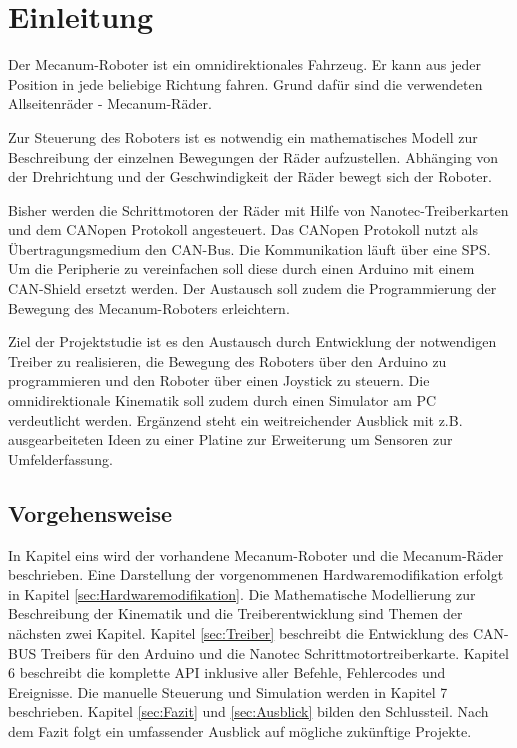 
\section{Einleitung}

Der Mecanum-Roboter ist ein omnidirektionales Fahrzeug. Er kann aus jeder Position in jede beliebige Richtung fahren. Grund dafür sind die verwendeten Allseitenräder - Mecanum-Räder. 

Zur Steuerung des Roboters ist es notwendig ein mathematisches Modell zur Beschreibung der einzelnen Bewegungen der Räder aufzustellen. Abhänging von der Drehrichtung und der Geschwindigkeit der Räder bewegt sich der Roboter.

Bisher werden die Schrittmotoren der Räder mit Hilfe von Nanotec-Treiberkarten und dem CANopen Protokoll angesteuert. Das CANopen Protokoll nutzt als Übertragungsmedium den CAN-Bus. Die Kommunikation läuft über eine SPS. Um die Peripherie zu vereinfachen soll diese durch einen Arduino mit einem CAN-Shield ersetzt werden. Der Austausch soll zudem die Programmierung der Bewegung des Mecanum-Roboters erleichtern.

Ziel der Projektstudie ist es den Austausch durch Entwicklung der notwendigen Treiber zu realisieren, die Bewegung des Roboters über den Arduino zu programmieren und den Roboter über einen Joystick zu steuern. Die omnidirektionale Kinematik soll zudem durch einen Simulator am PC verdeutlicht werden. Ergänzend steht ein weitreichender Ausblick mit z.B.  ausgearbeiteten Ideen zu einer Platine zur Erweiterung um Sensoren zur Umfelderfassung. 

\subsection*{Vorgehensweise}
In Kapitel eins wird der vorhandene Mecanum-Roboter und die Mecanum-Räder beschrieben. Eine Darstellung der vorgenommenen Hardwaremodifikation erfolgt in Kapitel \ref{sec:Hardwaremodifikation}. 
Die Mathematische Modellierung zur Beschreibung der Kinematik und die Treiberentwicklung sind Themen der nächsten zwei Kapitel. Kapitel \ref{sec:Treiber} beschreibt die Entwicklung des CAN-BUS Treibers für den Arduino und die Nanotec Schrittmotortreiberkarte. Kapitel 6 beschreibt die komplette API inklusive aller Befehle, Fehlercodes und Ereignisse. Die manuelle Steuerung und Simulation werden in Kapitel 7 beschrieben.
Kapitel \ref{sec:Fazit} und \ref{sec:Ausblick} bilden den Schlussteil. Nach dem Fazit folgt ein umfassender Ausblick auf mögliche zukünftige Projekte.

